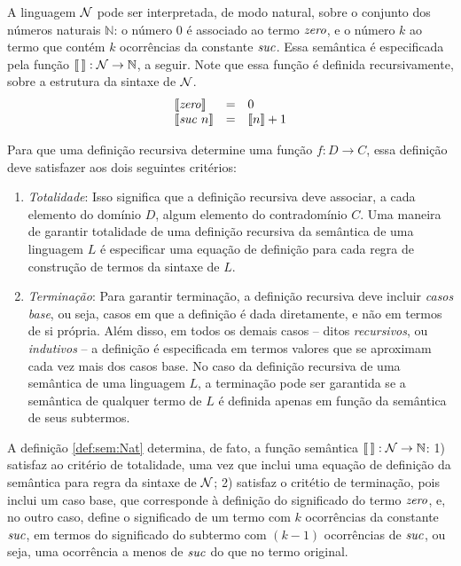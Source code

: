 \begin{Definition}\label{def:sem:Nat}
A linguagem $\mathcal{N}$ pode ser interpretada, de modo natural, sobre o conjunto dos números naturais $\mathbb{N}$: o número $0$ é associado ao termo $\textit{zero\/}$, e o número $k$ ao termo que contém $k$ ocorr\^encias da constante $\textit{suc\/}$. Essa semântica é especificada pela função $\llbracket\,\rrbracket : \mathcal{N} \rightarrow \mathbb{N}$, a seguir. Note que essa função é definida recursivamente, sobre a estrutura da sintaxe de $\mathcal{N}$. 
\[
\begin{array}{lcl}
\llbracket \textit{zero\/} \rrbracket & = & 0\\
\llbracket \textit{suc\/}\,\,n\rrbracket & = & \llbracket n \rrbracket + 1
\end{array}
\]
\end{Definition}
Para que uma definição recursiva determine uma função $f : D \rightarrow C$, essa definição deve satisfazer aos dois seguintes crit\'erios:
\begin{enumerate}

\item \emph{Totalidade\/}: Isso significa que a definição recursiva deve associar, a cada elemento do domínio $D$, algum elemento do contradomínio $C$.  Uma maneira de garantir totalidade de uma definição recursiva da semântica de uma linguagem $L$ é especificar uma equa\c{c}\~ao de definição para cada regra de construção de termos da sintaxe de $L$. 


\item \emph{Terminação\/}: Para garantir terminação, a definição recursiva deve incluir \emph{casos base\/}, ou seja, casos em que a definição é dada diretamente, e não em termos de si própria. Além disso, em todos os demais casos -- ditos \emph{recursivos\/}, ou \emph{indutivos\/} --  a definição é especificada em termos valores que se aproximam cada vez mais dos casos base. No caso da definição recursiva de uma semântica de uma linguagem $L$, a terminação pode ser garantida se a semântica de qualquer termo de $L$ é definida apenas em função da semântica de seus subtermos. 
\end{enumerate}

A definição \ref{def:sem:Nat} determina, de fato, a função semântica $\llbracket\,\rrbracket : \mathcal{N} \rightarrow \mathbb{N}$: 1) satisfaz ao critério de totalidade, uma vez que inclui uma equação de definição da semântica para regra da sintaxe de $\mathcal{N}$; 2) satisfaz o critétio de terminação, pois inclui um caso base, que corresponde à definição do significado do termo $\textit{zero\/}$, e, no outro caso, define o significado de um termo com $k$ ocorrências da constante $\textit{suc\/}$,  em termos do significado do subtermo com $(k-1)$ ocorrências de $\textit{suc\/}$, ou seja, uma ocorrência a menos de $\textit{suc\/}$ do que no termo original.

